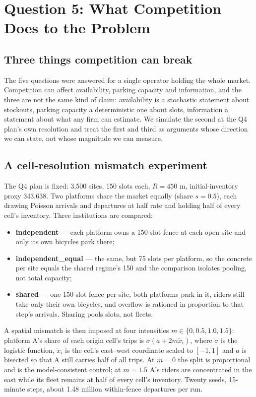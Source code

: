 \section{Question 5: What Competition Does to the Problem}\label{sec:q5}

\subsection{Three things competition can break}

The five questions were answered for a single operator holding the whole market.
Competition can affect availability, parking capacity and information, and the three are
not the same kind of claim: availability is a stochastic statement about stockouts,
parking capacity a deterministic one about slots, information a statement about what
any firm can estimate. We simulate the second at the Q4 plan's own resolution and treat
the first and third as arguments whose direction we can state, not whose magnitude we
can measure.

\subsection{A cell-resolution mismatch experiment}

The Q4 plan is fixed: 3,500 sites, 150 slots each, $R=450$ m, initial-inventory proxy
343,638. Two platforms share the market equally (share $s=0.5$), each drawing Poisson
arrivals and departures at half rate and holding half of every cell's inventory. Three
institutions are compared:
\begin{itemize}[leftmargin=1.2em,itemsep=0pt]
\item \textbf{independent} --- each platform owns a 150-slot fence at each open site and
  only its own bicycles park there;
\item \textbf{independent\_equal} --- the same, but 75 slots per platform, so the concrete
  per site equals the shared regime's 150 and the comparison isolates pooling, not total
  capacity;
\item \textbf{shared} --- one 150-slot fence per site, both platforms park in it, riders
  still take only their own bicycles, and overflow is rationed in proportion to that
  step's arrivals. Sharing pools slots, not fleets.
\end{itemize}
A spatial mismatch is then imposed at four intensities $m\in\{0,0.5,1.0,1.5\}$:
platform A's share of each origin cell's trips is $\sigma(a+2m\tilde x_i)$, where
$\sigma$ is the logistic function, $\tilde x_i$ is the cell's east--west coordinate scaled to $[-1,1]$ and $a$ is bisected
so that A still carries half of all trips. At $m=0$ the split is proportional and is the
model-consistent control; at $m=1.5$ A's riders are concentrated in the east while its
fleet remains at half of every cell's inventory. Twenty seeds, 15-minute steps,
about 1.48 million within-fence departures per run.

